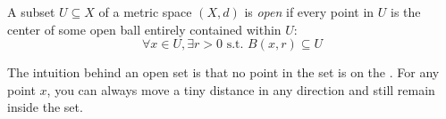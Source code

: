 \begin{math-stroke}
\setcounter{theorem}{38}
\begin{definition}\label{def:open-set}
A subset $U \subseteq X$ of a metric space $(X, d)$ is \emph{open} if every point in $U$ is the center of some open ball entirely contained within $U$:
\[ \forall x \in U, \exists r > 0 \text{ s.t. } B(x, r) \subseteq U \]
\end{definition}

\begin{center}
\end{center}

\begin{explanation-of-steps}
The intuition behind an open set is that no point in the set is on the . For any point $x$, you can always move a tiny distance in any direction and still remain inside the set.
\end{explanation-of-steps}
\end{math-stroke}


